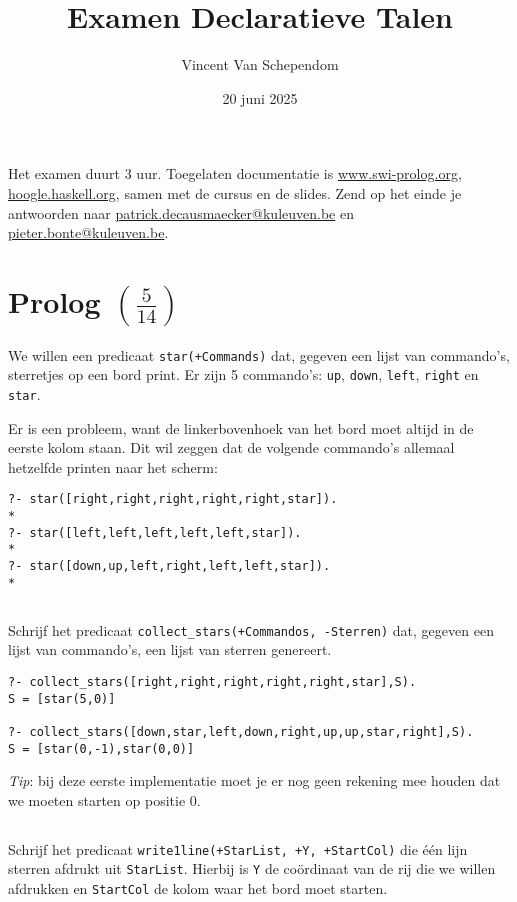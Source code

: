 \documentclass[kulak]{kulakarticle}
\title{Examen Declaratieve Talen}
\author{Vincent Van Schependom}
\date{20 juni 2025}
\begin{document}
	\maketitle

	Het examen duurt 3 uur. Toegelaten documentatie is \href{https://www.swi-prolog.org}{www.swi-prolog.org}, \href{https://hoogle.haskell.org}{hoogle.haskell.org}, samen met de
	cursus en de slides. Zend op het einde je antwoorden naar \href{mailto:patrick.decausmaecker@kuleuven.be}{patrick.decausmaecker@kuleuven.be} en \href{mailto:pieter.bonte@kuleuven.be}{pieter.bonte@kuleuven.be}.

	\section{Prolog \((\frac{5}{14})\)}

	We willen een predicaat \texttt{star(+Commands)} dat, gegeven een lijst van commando’s, sterretjes op een bord print. Er zijn 5 commando’s: \texttt{up}, \texttt{down}, \texttt{left}, \texttt{right} en \texttt{star}.

	Er is een probleem, want de linkerbovenhoek van het bord moet altijd in de eerste kolom staan. Dit wil zeggen dat de volgende commando's allemaal hetzelfde printen naar het scherm:

	\begin{verbatim}
?- star([right,right,right,right,right,star]).
*
?- star([left,left,left,left,left,star]).
*
?- star([down,up,left,right,left,left,star]).
*\end{verbatim}

	\subsection{}

	Schrijf het predicaat \texttt{collect\_stars(+Commandos, -Sterren)} dat, gegeven een lijst van commando's, een lijst van sterren genereert.
	\begin{verbatim}
?- collect_stars([right,right,right,right,right,star],S).
S = [star(5,0)]

?- collect_stars([down,star,left,down,right,up,up,star,right],S).
S = [star(0,-1),star(0,0)]\end{verbatim}
	\textit{Tip}: bij deze eerste implementatie moet je er nog geen rekening mee houden dat we moeten starten op positie 0.

	\subsection{}
	Schrijf het predicaat \texttt{write1line(+StarList, +Y, +StartCol)} die één lijn sterren afdrukt uit \texttt{StarList}. Hierbij is \texttt{Y} de coördinaat van de rij die we willen afdrukken en \texttt{StartCol} de kolom waar het bord moet starten.
\end{document}

